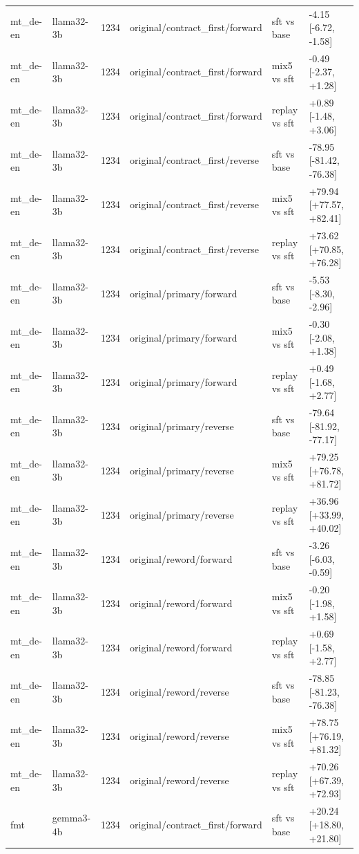 \begin{table}[t]
\begin{tabular}{llllll}
mt\_de-en & llama32-3b & 1234 & original/contract\_first/forward & sft vs base & -4.15 [-6.72, -1.58] \\
mt\_de-en & llama32-3b & 1234 & original/contract\_first/forward & mix5 vs sft & -0.49 [-2.37, +1.28] \\
mt\_de-en & llama32-3b & 1234 & original/contract\_first/forward & replay vs sft & +0.89 [-1.48, +3.06] \\
mt\_de-en & llama32-3b & 1234 & original/contract\_first/reverse & sft vs base & -78.95 [-81.42, -76.38] \\
mt\_de-en & llama32-3b & 1234 & original/contract\_first/reverse & mix5 vs sft & +79.94 [+77.57, +82.41] \\
mt\_de-en & llama32-3b & 1234 & original/contract\_first/reverse & replay vs sft & +73.62 [+70.85, +76.28] \\
mt\_de-en & llama32-3b & 1234 & original/primary/forward & sft vs base & -5.53 [-8.30, -2.96] \\
mt\_de-en & llama32-3b & 1234 & original/primary/forward & mix5 vs sft & -0.30 [-2.08, +1.38] \\
mt\_de-en & llama32-3b & 1234 & original/primary/forward & replay vs sft & +0.49 [-1.68, +2.77] \\
mt\_de-en & llama32-3b & 1234 & original/primary/reverse & sft vs base & -79.64 [-81.92, -77.17] \\
mt\_de-en & llama32-3b & 1234 & original/primary/reverse & mix5 vs sft & +79.25 [+76.78, +81.72] \\
mt\_de-en & llama32-3b & 1234 & original/primary/reverse & replay vs sft & +36.96 [+33.99, +40.02] \\
mt\_de-en & llama32-3b & 1234 & original/reword/forward & sft vs base & -3.26 [-6.03, -0.59] \\
mt\_de-en & llama32-3b & 1234 & original/reword/forward & mix5 vs sft & -0.20 [-1.98, +1.58] \\
mt\_de-en & llama32-3b & 1234 & original/reword/forward & replay vs sft & +0.69 [-1.58, +2.77] \\
mt\_de-en & llama32-3b & 1234 & original/reword/reverse & sft vs base & -78.85 [-81.23, -76.38] \\
mt\_de-en & llama32-3b & 1234 & original/reword/reverse & mix5 vs sft & +78.75 [+76.19, +81.32] \\
mt\_de-en & llama32-3b & 1234 & original/reword/reverse & replay vs sft & +70.26 [+67.39, +72.93] \\
fmt & gemma3-4b & 1234 & original/contract\_first/forward & sft vs base & +20.24 [+18.80, +21.80] \\

\end{tabular}
\end{table}

